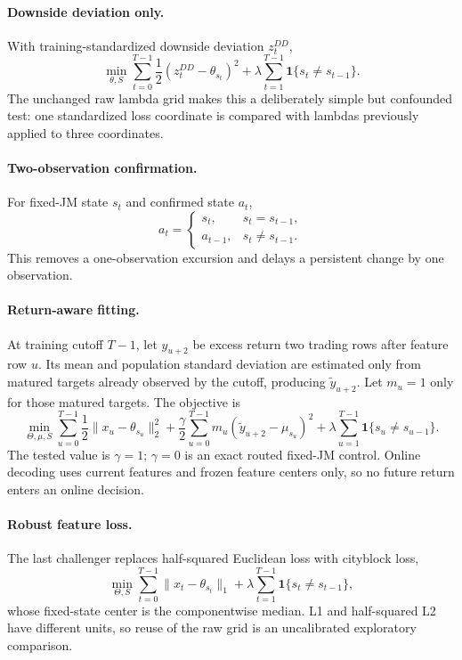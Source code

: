 \documentclass[11pt]{article}
\newcommand{\ind}{\mathbf{1}}
\begin{document}
\paragraph{Downside deviation only.}
With training-standardized downside deviation \(z^{DD}_t\),
\begin{equation}
\min_{\theta,S}
\sum_{t=0}^{T-1}\frac12(z^{DD}_t-\theta_{s_t})^2
+\lambda\sum_{t=1}^{T-1}\ind\{s_t\ne s_{t-1}\}.
\label{eq:ddonly}
\end{equation}
The unchanged raw lambda grid makes this a deliberately simple but confounded
test: one standardized loss coordinate is compared with lambdas previously
applied to three coordinates.

\paragraph{Two-observation confirmation.}
For fixed-JM state \(s_t\) and confirmed state \(a_t\),
\begin{equation}
a_t=
\begin{cases}
s_t,&s_t=s_{t-1},\\
a_{t-1},&s_t\ne s_{t-1}.
\end{cases}
\label{eq:confirmation}
\end{equation}
This removes a one-observation excursion and delays a persistent change by one
observation.

\paragraph{Return-aware fitting.}
At training cutoff \(T-1\), let \(y_{u+2}\) be excess return two trading rows
after feature row \(u\). Its mean and population standard deviation are
estimated only from matured targets already observed by the cutoff, producing
\(\widetilde y_{u+2}\). Let \(m_u=1\) only for those matured targets. The
objective is
\begin{equation}
\min_{\Theta,\mu,S}
\sum_{u=0}^{T-1}\frac12\|x_u-\theta_{s_u}\|_2^2
+\frac{\gamma}{2}\sum_{u=0}^{T-1}m_u
(\widetilde y_{u+2}-\mu_{s_u})^2
+\lambda\sum_{u=1}^{T-1}\ind\{s_u\ne s_{u-1}\}.
\label{eq:returnaware}
\end{equation}
The tested value is \(\gamma=1\); \(\gamma=0\) is an exact routed fixed-JM
control. Online decoding uses current features and frozen feature centers only,
so no future return enters an online decision.

\paragraph{Robust feature loss.}
The last challenger replaces half-squared Euclidean loss with cityblock loss,
\begin{equation}
\min_{\Theta,S}
\sum_{t=0}^{T-1}\|x_t-\theta_{s_t}\|_1
+\lambda\sum_{t=1}^{T-1}\ind\{s_t\ne s_{t-1}\},
\label{eq:l1}
\end{equation}
whose fixed-state center is the componentwise median. L1 and half-squared L2
have different units, so reuse of the raw grid is an uncalibrated exploratory
comparison.
\end{document}
